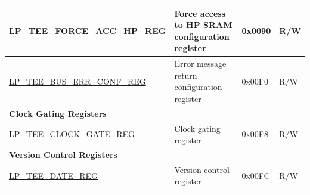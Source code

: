 \begin{longtable}{ | l | l | p{1.3cm} | p{1cm} | }
\hyperref[regdesc:LPTEEFORCEACCHPREG]{LP\_TEE\_FORCE\_ACC\_HP\_REG} & Force access to HP SRAM configuration register & 0x0090 & R/W \\ \hline

\hyperref[regdesc:LPTEEBUSERRCONFREG]{LP\_TEE\_BUS\_ERR\_CONF\_REG} & Error message return configuration register & 0x00F0 & R/W \\ \hline
\multicolumn{4}{|l|}{\textbf{Clock Gating Registers}} \\ \hline
\hyperref[regdesc:LPTEECLOCKGATEREG]{LP\_TEE\_CLOCK\_GATE\_REG} & Clock gating register & 0x00F8 & R/W \\ \hline
\multicolumn{4}{|l|}{\textbf{Version Control Registers}} \\ \hline
\hyperref[regdesc:LPTEEDATEREG]{LP\_TEE\_DATE\_REG} & Version control register & 0x00FC & R/W \\ \hline
\end{longtable}

